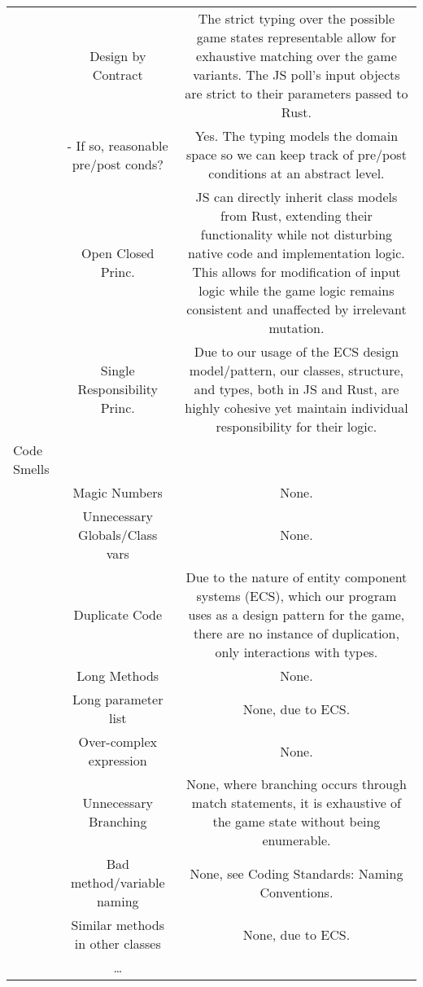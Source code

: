 \documentclass[11pt]{article}
\begin{document}
\begin{center}
\begin{tabular}{|l|c|c|}
 & Design by Contract & The strict typing over the possible game states representable allow for exhaustive matching over the game variants. The JS poll's input objects are strict to their parameters passed to Rust.\\
 & - If so, reasonable pre/post conds? & Yes. The typing models the domain space so we can keep track of pre/post conditions at an abstract level.\\
 & Open Closed Princ. & JS can directly inherit class models from Rust, extending their functionality while not disturbing native code and implementation logic. This allows for modification of input logic while the game logic remains consistent and unaffected by irrelevant mutation.\\
 & Single Responsibility Princ. & Due to our usage of the ECS design model/pattern, our classes, structure, and types, both in JS and Rust, are highly cohesive yet maintain individual responsibility for their logic.\\
\hline
Code Smells &  & \\
\hline
 & Magic Numbers & None.\\
 & Unnecessary Globals/Class vars & None.\\
 & Duplicate Code & Due to the nature of entity component systems (ECS), which our program uses as a design pattern for the game, there are no instance of duplication, only interactions with types.\\
 & Long Methods & None.\\
 & Long parameter list & None, due to ECS.\\
 & Over-complex expression & None.\\
 & Unnecessary Branching & None, where branching occurs through match statements, it is exhaustive of the game state without being enumerable.\\
 & Bad method/variable naming & None, see Coding Standards: Naming Conventions.\\
 & Similar methods in other classes & None, due to ECS.\\
 & \ldots{} & \\
\hline
\end{tabular}
\end{center}
\end{document}
